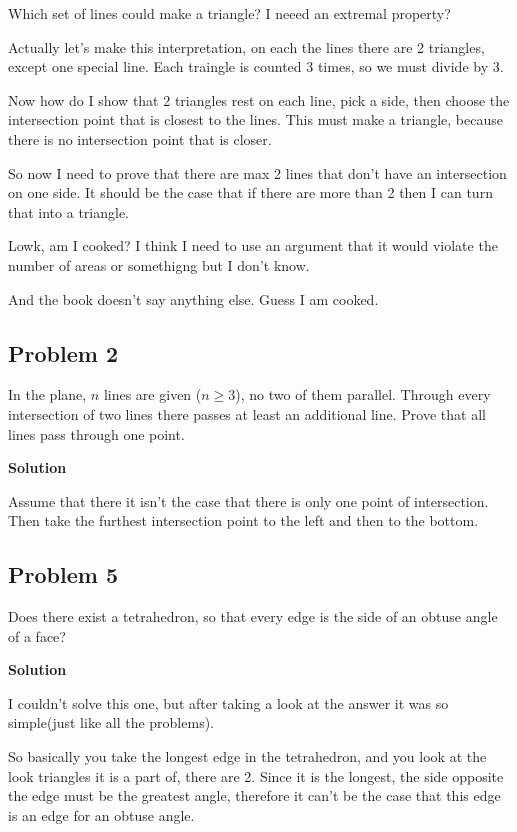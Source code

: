 \documentclass{article}
\begin{document}
Which set of lines could make a triangle? I neeed an extremal property? 

Actually let's make this interpretation, on each the lines there are 2 triangles, except one special line. 
Each traingle is counted 3 times, so we must divide by 3. 

Now how do I show that 2 triangles rest on each line, pick a side, then choose the intersection 
point that is closest to the lines. This must make a triangle, because there is no intersection point that is closer.

So now I need to prove that there are max 2 lines that don't have an intersection on one side. It should be the case that 
if there are more than 2 then I can turn that into a triangle. 

Lowk, am I cooked? I think I need to use an argument that it would violate the number of areas or somethigng but I don't know. 

And the book doesn't say anything else. Guess I am cooked. 

\subsection{Problem 2}

In the plane, $n$ lines are given ($n\geq 3$), no two of them parallel. Through every
intersection of two lines there passes at least an additional line. Prove that all lines
pass through one point.

\textbf{Solution}

Assume that there it isn't the case that there is only one point of intersection. Then take the furthest
intersection point to the left and then to the bottom. 


\subsection{Problem 5}

Does there exist a tetrahedron, so that every edge is the side of an obtuse angle of a face? 

\textbf{Solution}

I couldn't solve this one, but after taking a look at the answer it was so simple(just like all the problems).

So basically you take the longest edge in the tetrahedron, and you look at the look triangles it is a part of, there are 2.
Since it is the longest, the side opposite the edge must be the greatest angle, therefore it can't be the case that this edge is an edge for
an obtuse angle.
\end{document}
